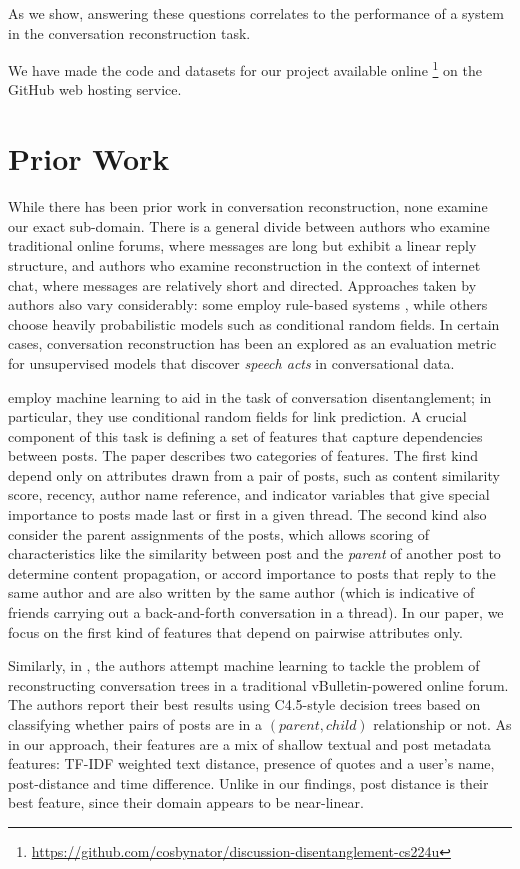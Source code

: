 \documentclass{article}
\begin{document}
As we show, answering these questions correlates to the performance of a system
in the conversation reconstruction task. 

We have made the code and datasets for our project available online
\footnote{\url{https://github.com/cosbynator/discussion-disentanglement-cs224u}} on the
GitHub web hosting service.

\section{Prior Work}
\label{sec:prior_work}
While there has been prior work in conversation reconstruction, none examine
our exact sub-domain. There is a general divide between authors who examine
traditional online forums, where messages are long but exhibit a linear reply
structure, and authors who examine reconstruction in the context of internet
chat, where messages are relatively short and directed. Approaches taken by
authors also vary considerably: some employ rule-based systems
\cite{Wang2008a}, while others choose heavily probabilistic models such as
conditional random fields. In certain cases, conversation reconstruction has
been an explored as an evaluation metric for unsupervised models that discover
\textit{speech acts} in conversational data.

 employ machine
learning to aid in the task of conversation disentanglement; in particular,
they use conditional random fields for link prediction. A crucial component of
this task is defining a set of features that capture dependencies between
posts. The paper describes two categories of features. The first kind depend
only on attributes drawn from a pair of posts, such as content similarity
score, recency, author name reference, and indicator variables that give
special importance to posts made last or first in a given thread. The second
kind also consider the parent assignments of the posts, which allows scoring
of characteristics like the similarity between  post and the \emph{parent} of
another post to determine content propagation, or accord importance to posts
that reply to the same author and are also written by the same author (which
is indicative of friends carrying out a back-and-forth conversation in a
thread). In our paper, we focus on the first kind of features that depend on
pairwise attributes only.

Similarly, in , the authors attempt machine learning to
tackle the problem of reconstructing conversation trees in a traditional
vBulletin-powered online forum. The authors report their best results using
C4.5-style decision trees based on classifying whether pairs of posts are in a
$(parent, child)$ relationship or not. As in our approach, their features are
a mix of shallow textual and post metadata features: TF-IDF weighted text
distance, presence of quotes and a user's name, post-distance and time
difference. Unlike in our findings, post distance is their best feature, since
their domain appears to be near-linear.
\end{document}
